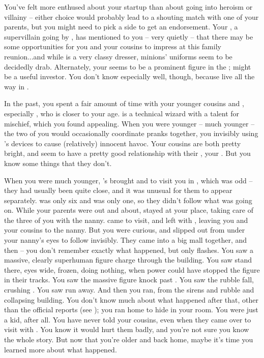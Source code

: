 \documentclass[char]{LRSguildcamp1}
\begin{document}
You've felt more enthused about your startup than about going into heroism or villainy -- either choice would probably lead to a shouting match with one of your parents, but you might need to pick a side to get an endorsement.  Your \cGrandma{\grandparent} \cGrandma{}, a supervillain going by \cGrandma{\MYsupername}, has mentioned to you -- very quietly -- that there may be some opportunities for you and your cousins to impress \cGrandma{\them} at this family reunion...and while \cGrandma{} \cGrandma{\themself} is a very classy dresser, \cGrandma{\their} minions' uniforms seem to be decidedly drab.  Alternately, your \cYoungest{\uncle} \cYoungest{} seems to be a prominent figure in the \cHeroLeague{\intro}; \cYoungest{\they} might be a useful investor.  You don't know \cYoungest{\them} especially well, though, because \cYoungest{\they} live all the way in \pCityYoungest{}. 

In the past, you spent a fair amount of time with your younger cousins \cTeen{} and \cTween{}, especially \cTeen{}, who is closer to your age.  \cTeen{} is a technical wizard with a talent for mischief, which you found appealing.  When you were younger -- much younger -- the two of you would occasionally coordinate pranks together, you invisibly using \cTeen{}'s devices to cause (relatively) innocent havoc.
  Your cousins are both pretty bright, and seem to have a pretty good relationship with their \cArchitect{\parent}, your \cArchitect{\uncle} \cArchitect{}.  But you know some things that they don't.

When you were much younger, \cArchitect{}'s \cAS{\spouse} \cAS{} brought \cTeen{} and \cTween{} to visit you in \pCityO{}, which was odd -- they had usually been quite close, and it was unusual for them to appear separately.  \cTeen{} was only six and \cTween{} was only one, so they didn't follow what was going on.  While your parents were out and about, \cAS{} stayed at your place, taking care of the three of you with the nanny.  \cArchitect{} came to visit, and \cArchitect{\they} left with \cAS{}, leaving you and your cousins to the nanny.  But you were curious, and slipped out from under your nanny's eyes to follow invisibly.  They came into a big mall together, and then -- you don't remember exactly what happened, but only flashes.  You saw a massive, clearly superhuman figure charge through the building.  You saw \cArchitect{} stand there, eyes wide, frozen, doing nothing, when \cArchitect{\their} power could have stopped the figure in their tracks. You saw the massive figure knock past \cAS{}.  You saw the rubble fall, crushing \cAS{}.  You saw \cArchitect{} run away.  And then you ran, from the sirens and rubble and collapsing building.  You don't know much about what happened after that, other than the official reports (see \bChicagoIncident{}); you ran home to hide in your room.  You were just a kid, after all.
  You have never told your cousins, even when they came over to visit with \cArchitect{}.  You know it would hurt them badly, and you're not sure you know the whole story.  But now that you're older and back home, maybe it's time you learned more about what happened.
\end{document}
